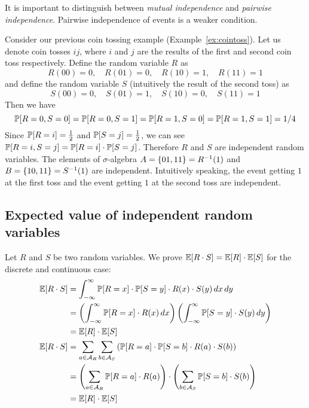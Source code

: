 It is important to distinguish between \emph{mutual independence} and \emph{pairwise independence}.
Pairwise independence of events is a weaker condition.

\begin{example}
  Consider our previous coin tossing example (Example~\ref{ex:cointoss}).
  Let us denote coin tosses $ij$, where $i$ and $j$ are the results of the first and second coin toss respectively.
  Define the random variable $R$ as
  \[ R(00)=0, \quad R(01)=0, \quad R(10)=1, \quad R(11)=1 \]
  and define the random variable $S$ (intuitively the result of the second toss) as
  \[ S(00)=0, \quad S(01)=1, \quad S(10)=0, \quad S(11)=1 \]
  Then we have
  \[
    \mathbb P[R=0, S=0] = 
    \mathbb P[R=0, S=1] = 
    \mathbb P[R=1, S=0] = 
    \mathbb P[R=1, S=1] = 1/4
  \]
  Since $\mathbb P[R=i] = \frac12$ and $\mathbb P[S=j] = \frac12$,
  we can see $\mathbb P[R=i, S=j] = \mathbb P[R=i] \cdot \mathbb P[S=j]$.
  Therefore $R$ and $S$ are independent random variables.
  The elements of $\sigma$-algebra
  $A = \left\{01, 11\right\} = R^{-1}(1)$ and $B = \left\{10, 11\right\} = S^{-1}(1)$
  are independent.
  Intuitively speaking, the event getting $1$ at the first toss
  and the event getting $1$ at the second toss
  are independent.
\end{example}

\subsection{Expected value of independent random variables}
\label{sec:bp-ev-indep}
%
Let $R$ and $S$ be two random variables. We prove $\mathbb E[R \cdot S] = \mathbb E[R] \cdot \mathbb E[S]$
for the discrete and continuous case:
%
\begin{align*}
  \mathbb E[R \cdot S] &= \int_{-\infty}^{\infty} \mathbb P[R=x] \cdot \mathbb P[S=y] \cdot R(x) \cdot S(y) \, dx \, dy \\
                &= \left(\int_{-\infty}^{\infty} \mathbb P[R=x] \cdot R(x) \, dx\right) \left(\int_{-\infty}^{\infty} \mathbb P[S=y] \cdot S(y) \, dy\right) \\
                &= \mathbb E[R] \cdot \mathbb E[S] \\
  \mathbb E[R \cdot S] &= \sum_{a \in \mathcal A_R} \sum_{b \in \mathcal A_S} \left(\mathbb P[R=a] \cdot \mathbb P[S=b] \cdot R(a) \cdot S(b)\right) \\
                &= \left(\sum_{a \in \mathcal A_R} \mathbb P[R=a] \cdot R(a)\right) \cdot \left(\sum_{b \in \mathcal A_S} \mathbb P[S=b] \cdot S(b)\right) \\
                &= \mathbb E[R] \cdot \mathbb E[S]
\end{align*}

